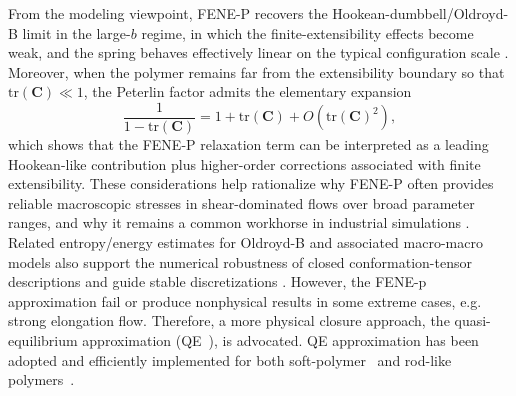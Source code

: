 \documentclass[preprint,12pt]{elsarticle}
\begin{document}
From the modeling viewpoint, FENE-P recovers the Hookean-dumbbell/Oldroyd-B limit in the large-$b$ regime, in which the finite-extensibility effects become weak, and the spring behaves effectively linear on the typical configuration scale \cite{Bird87}. Moreover, when the polymer remains far from the extensibility boundary so that $\mathrm{tr}(\bm{C})\ll 1$, the Peterlin factor admits the elementary expansion
\begin{equation}
    \frac{1}{1-\mathrm{tr}(\bm{C})}
    = 1 + \mathrm{tr}(\bm{C}) + O\!\left(\mathrm{tr}(\bm{C})^2\right),
\end{equation}
which shows that the FENE-P relaxation term can be interpreted as a leading Hookean-like contribution plus higher-order corrections associated with finite extensibility. These considerations help rationalize why FENE-P often provides reliable macroscopic stresses in shear-dominated flows over broad parameter ranges, and why it remains a common workhorse in industrial simulations \cite{Yamani23}. Related entropy/energy estimates for Oldroyd-B and associated macro-macro models also support the numerical robustness of closed conformation-tensor
descriptions and guide stable discretizations \cite{Hu07}.
However, the FENE-p approximation fail or produce nonphysical results in some extreme cases, e.g. strong elongation flow.
Therefore, a more physical closure approach, the quasi-equilibrium approximation (QE~\cite{GorbaKZ2004ConstructiveMethods}), is advocated. QE approximation has been adopted and efficiently implemented for both soft-polymer~\cite{Ilg02,Wang08} and rod-like polymers~\cite{chaubal_closure_1998,YuJZ2010,JiangY2021,WeadySS2022ThermoCt,WeadySS2022Fast}. 
\end{document}

